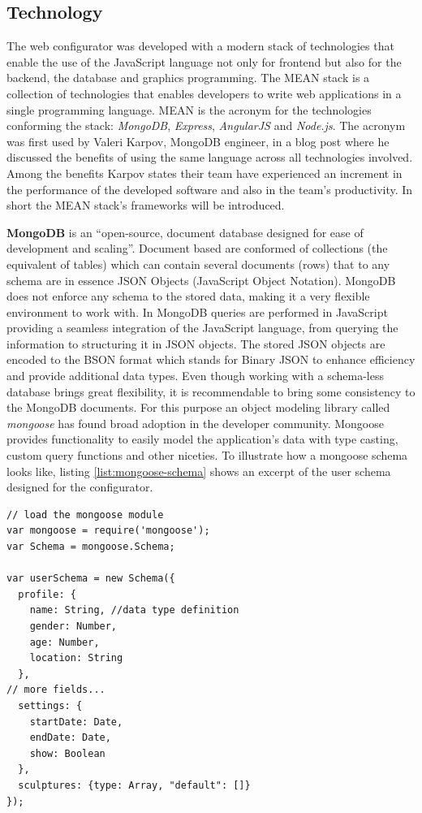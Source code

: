 \documentclass[../medieninformatik-arbeit.tex]{subfiles}
\begin{document}
\subsection{Technology}
The web configurator was developed with a modern stack of technologies that enable the use of the JavaScript language not only for frontend but also for the backend, the database and graphics programming. The MEAN stack is a collection of technologies that enables developers to write web applications in a single programming language. MEAN is the acronym for the technologies  conforming the stack: \textit{MongoDB}\cite{mongodb}, \textit{Express}\cite{express}, \textit{AngularJS}\cite{angular} and \textit{Node.js}\cite{joyent2015node}. The acronym was first used by Valeri Karpov, MongoDB engineer, in a blog post\cite{meanstack} where he discussed the benefits of using the same language across all technologies involved. Among the benefits Karpov states their team have experienced an increment in the performance of the developed software and also in the team's productivity. In short the MEAN stack's frameworks will be introduced. 

\textbf{MongoDB} is an ``open-source, document database designed for ease of development and scaling''\cite{mongodb}. Document based are conformed of collections (the equivalent of tables) which can contain several documents (rows) that  to any schema are in essence JSON Objects (JavaScript Object Notation). MongoDB does not enforce any schema to the stored data, making it a very flexible environment to work with. In MongoDB queries are performed in JavaScript providing a seamless integration of the JavaScript language, from querying the information to structuring it in JSON objects. The stored JSON objects are encoded to the BSON format which stands for Binary JSON to enhance efficiency and provide additional data types. Even though working with a schema-less database brings great flexibility, it is recommendable to bring some consistency to the MongoDB documents. For this purpose an object modeling library called \textit{mongoose}\cite{mongoose} has found broad adoption in the developer community. Mongoose provides functionality to easily model the application's data with type casting, custom query functions and other niceties. To illustrate how a mongoose schema looks like, listing \ref{list:mongoose-schema} shows an excerpt of the user schema designed for the configurator.

\begin{lstlisting}[style=htmlcssjs, caption={An excerpt of the user mongoose schema},label=list:mongoose-schema]
// load the mongoose module
var mongoose = require('mongoose');
var Schema = mongoose.Schema;

var userSchema = new Schema({
  profile: {
    name: String, //data type definition
    gender: Number,
    age: Number,
    location: String
  },
// more fields... 
  settings: {
    startDate: Date,
    endDate: Date,
    show: Boolean
  },
  sculptures: {type: Array, "default": []}
});
\end{lstlisting} 
\end{document}
